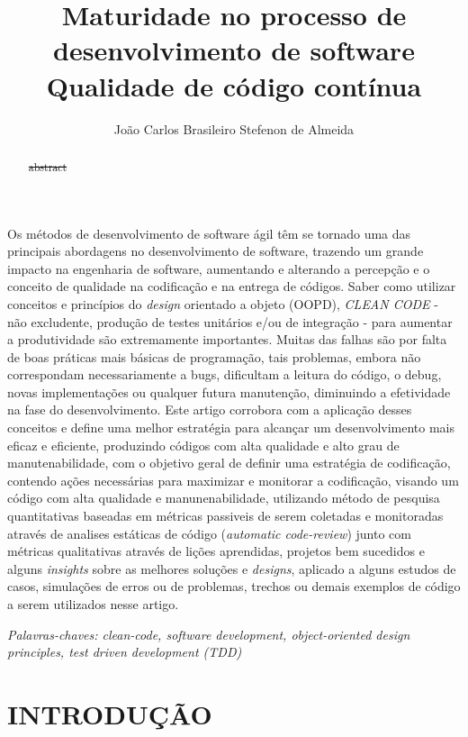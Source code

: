 \documentclass[12pt]{article}
\title{Maturidade no processo de desenvolvimento de software\\ Qualidade de código contínua }
\author{João Carlos Brasileiro Stefenon de Almeida\inst{1}}
\begin{document}
 


\maketitle

  
\begin{resumo} 
Os métodos de desenvolvimento de software ágil têm se tornado uma das principais abordagens no desenvolvimento de software, trazendo um grande impacto na engenharia de software, aumentando e alterando a percepção e o conceito de qualidade na codificação e na entrega de códigos.
Saber como utilizar conceitos e princípios do \textit{design} orientado a objeto (OOPD), \textit{CLEAN CODE} - não excludente, produção de testes unitários e/ou de integração - para aumentar a produtividade são extremamente importantes.
Muitas das falhas são por falta de boas práticas mais básicas de programação, tais problemas, embora não correspondam necessariamente a bugs, dificultam a leitura do código, o debug, novas implementações ou qualquer futura manutenção, diminuindo a efetividade na fase do desenvolvimento.
Este artigo corrobora com a aplicação desses conceitos e define uma melhor estratégia para alcançar um desenvolvimento mais eficaz e eficiente, produzindo códigos com alta qualidade e alto grau de manutenabilidade, com o objetivo geral de definir uma estratégia de codificação, contendo ações necessárias para maximizar e monitorar a codificação, visando um código com alta qualidade e manunenabilidade, utilizando método de pesquisa quantitativas baseadas em métricas passiveis de serem coletadas e monitoradas através de analises estáticas de código (\textit{automatic code-review}) junto com métricas qualitativas através de lições aprendidas, projetos   bem sucedidos e alguns \textit{insights} sobre as melhores soluções e \textit{designs}, aplicado a alguns estudos de casos, simulações de erros ou de problemas, trechos ou demais exemplos de código a serem utilizados nesse artigo. 
\end{resumo}


\begin{abstract}
\sout{ abstract }
\end{abstract}


\textit{Palavras-chaves: clean-code, software development, object-oriented design principles, test driven development (TDD) }



\part{INTRODUÇÃO}
\end{document}
